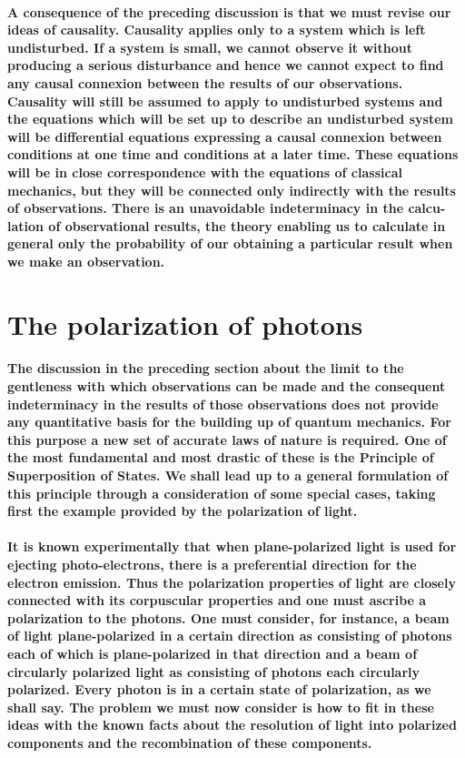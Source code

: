 \documentclass[10pt, kindle, oneside]{kindle}
\begin{document}
\paragraph{A consequence of the preceding discussion is that we must revise our ideas of causality. Causality applies only to a system which is left undisturbed. If a system is small, we cannot observe it without producing a serious disturbance and hence we cannot expect to find any causal connexion between the results of our observations. Causality will still be assumed to apply to undisturbed systems and the equations which will be set up to describe an undisturbed system will be differential equations expressing a causal connexion between conditions at one time and conditions at a later time. These equations will be in close correspondence with the equations of classical mechanics, but they will be connected only indirectly with the results of observations. There is an unavoidable indeterminacy in the calcu-lation of observational results, the theory enabling us to calculate in general only the probability of our obtaining a particular result when we make an observation.}
\section{The polarization of photons}
\paragraph{The discussion in the preceding section about the limit to the gentleness with which observations can be made and the consequent indeterminacy in the results of those observations does not provide any quantitative basis for the building up of quantum mechanics. For this purpose a new set of accurate laws of nature is required. One of the most fundamental and most drastic of these is the Principle of Superposition of States. We shall lead up to a general formulation of this principle through a consideration of some special cases, taking first the example provided by the polarization of light.}
\paragraph{It is known experimentally that when plane-polarized light is used for ejecting photo-electrons, there is a preferential direction for the electron emission. Thus the polarization properties of light are closely connected with its corpuscular properties and one must ascribe a polarization to the photons. One must consider, for instance, a beam of light plane-polarized in a certain direction as consisting of photons each of which is plane-polarized in that direction and a beam of circularly polarized light as consisting of photons each circularly polarized. Every photon is in a certain state of polarization, as we shall say. The problem we must now consider is how to fit in these ideas with the known facts about the resolution of light into polarized components and the recombination of these components.}
\end{document}
